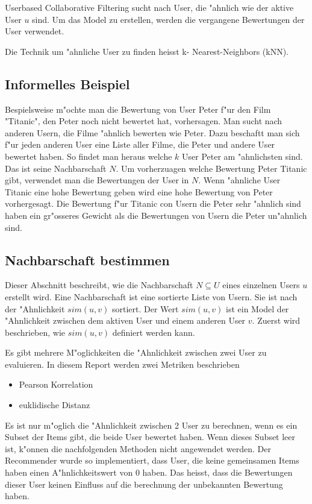 \documentclass[a4paper, 12pt]{article}
\begin{document}
Userbased Collaborative Filtering sucht nach User, die "ahnlich wie der aktive User $u$ sind. Um das Model zu erstellen, werden die vergangene Bewertungen der User verwendet.

Die Technik um "ahnliche User zu finden heisst k- Nearest-Neighbors (kNN). 

\subsection{Informelles Beispiel}
\label{sec:example}

Bespielsweise m"ochte man die Bewertung von User Peter f"ur den Film "Titanic", den Peter noch nicht bewertet hat, vorhersagen. Man sucht nach anderen Usern, die Filme "ahnlich bewerten wie Peter. Dazu beschaftt man sich f"ur jeden anderen User eine Liste aller Filme, die Peter und andere User bewertet haben. So findet man heraus welche $k$ User Peter am "ahnlichsten sind. Das ist seine Nachbarschaft $N$. Um vorherzuagen welche Bewertung Peter Titanic gibt, verwendet man die Bewertungen der User in $N$. Wenn "ahnliche User Titanic eine hohe Bewertung geben wird eine hohe Bewertung von Peter vorhergesagt. Die Bewertung f"ur Titanic con Usern die Peter sehr "ahnlich sind haben ein gr"osseres Gewicht als die Bewertungen von Usern die Peter un"ahnlich sind.


\subsection{Nachbarschaft bestimmen}
\label{sec:neigborhood}

Dieser Abschnitt beschreibt, wie die Nachbarschaft  $N \subseteq U$ eines einzelnen Users $u$ erstellt wird. Eine Nachbarschaft ist eine sortierte Liste von Usern. Sie ist nach der "Ahnlichkeit $sim(u,v)$ sortiert.  Der Wert $sim(u,v)$ ist ein Model der "Ahnlichkeit zwischen dem aktiven User und einem anderen User $v$. Zuerst wird beschrieben, wie $sim(u,v)$ definiert werden kann.

Es gibt mehrere M"oglichkeiten die "Ahnlichkeit zwischen zwei User zu evaluieren. In diesem Report werden zwei Metriken beschrieben

\begin{itemize}
  \item Pearson Korrelation 
  \item euklidische Distanz
\end{itemize}


Es ist nur m"oglich die "Ahnlichkeit zwischen 2 User zu berechnen, wenn es ein Subset der Items gibt, die beide User bewertet haben. Wenn dieses Subset leer ist, k"onnen die nachfolgenden Methoden nicht angewendet werden. Der Recommender wurde so implementiert, dass User, die keine gemeinsamen Items haben einen A"hnlichkeitswert von 0 haben. Das heisst, dass die Bewertungen dieser User keinen Einfluss auf die berechnung der unbekannten Bewertung haben. 
\end{document}
